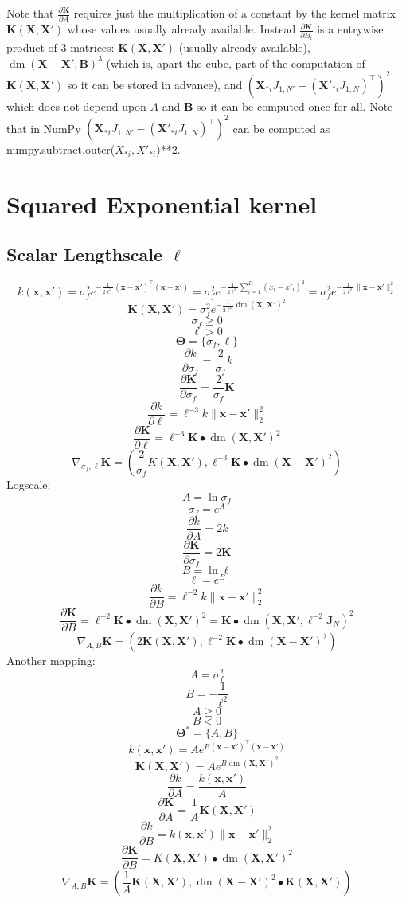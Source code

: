 \documentclass[a4paper,11pt]{article}
\newcommand\x{{\mathbf x}}
\newcommand\X{{\mathbf X}}
\newcommand\K{{\mathbf K}}
\newcommand\J{{\mathbf J}}
\DeclareMathOperator*{\dm}{dm}
\begin{document}
Note that $\frac{\partial \K}{\partial A}$ requires just the
multiplication of a constant by the kernel matrix $\K(\X,\X')$ whose
values usually already available. Instead $\frac{\partial \K}{\partial
  B_i}$ is a entrywise product of 3 matrices: $\K(\X,\X')$ (usually
already available), $\dm(\X-\X',\mathbf{B})^3$ (which is, apart the
cube, part of the computation of $\K(\X,\X')$ so it can be stored in
advance), and $(\X_{*i}J_{1,N'}- (\X'_{*i}J_{1,N})^{\top})^2$ which
does not depend upon $A$ and $\mathbf{B}$ so it can be computed once
for all. Note that in NumPy $(\X_{*i}J_{1,N'}-
(\X'_{*i}J_{1,N})^{\top})^2$ can be computed as {\ttfamily
  numpy.subtract.outer($X_{*i},X'_{*i}$)**2}.

\section{Squared Exponential kernel}

\subsection{Scalar Lengthscale $\ell$}
$$k(\x,\x') = \sigma_f^2 e^{-\frac{1}{2\ell^2} (\x-\x')^{\top}(\x-\x')}
  = \sigma_f^2 e^{-\frac{1}{2\ell^2} \sum_{i=1}^D (x_i - x'_i)^2} =
  \sigma_f^2 e^{-\frac{1}{2\ell^2} \|\x-\x'\|_2^2}$$ 
$$\K(\X,\X') = \sigma_f^2 e^{-\frac{1}{2\ell^2} \dm(\X,\X')^2}$$
$$\sigma_f \ge 0$$
$$\ell > 0$$
$$\mathbf{\Theta} = \{ \sigma_f, \ell \}$$
$$\frac{\partial k}{\partial \sigma_f} = \frac{2}{\sigma_f}k$$
$$\frac{\partial \K}{\partial \sigma_f} = \frac{2}{\sigma_f}\K$$
$$\frac{\partial k}{\partial \ell} = \ell^{-3} k \|\x-\x'\|_2^2 $$
$$\frac{\partial \K}{\partial \ell} = \ell^{-3} \K \bullet \dm(\X,\X')^2$$
$$\nabla_{\sigma_f,\ell} \K = \left(\frac{2}{\sigma_f}K(\X,\X'), \ell^{-3} \K \bullet \dm(\X-\X')^2 \right)$$
Logscale:
$$A = \ln{\sigma_f}$$
$$\sigma_f = e^A$$
$$\frac{\partial k}{\partial A} = 2k$$
$$\frac{\partial \K}{\partial \sigma_f} = 2\K$$
$$B = \ln{\ell}$$
$$\ell = e^B$$
$$\frac{\partial k}{\partial B} = \ell^{-2} k \|\x-\x'\|_2^2$$
$$\frac{\partial \K}{\partial B} = \ell^{-2} \K \bullet \dm(\X,\X')^2 = \K \bullet \dm(\X,\X',\ell^{-2}\J_N)^2$$
$$\nabla_{A,B} \K = \left( 2\K(\X,\X'), \ell^{-2} \K \bullet \dm(\X-\X')^2 \right)$$
Another mapping:
$$A = \sigma_f^2$$
$$B = -\frac{1}{\ell^2}$$
$$A \ge 0$$
$$B < 0$$
$$\mathbf{\Theta}^* = \{ A, B\}$$
$$k(\x,\x') = A e^{B (\x-\x')^{\top}(\x-\x')}$$
$$\K(\X,\X') = A e^{B \dm(\X,\X')^2}$$
$$\frac{\partial k}{\partial A} = \frac{k(\x,\x')}{A}$$
$$\frac{\partial \K}{\partial A} = \frac{1}{A}\K(\X,\X')$$
$$\frac{\partial k}{\partial B} = k(\x,\x') \|\x-\x'\|_2^2$$
$$\frac{\partial \K}{\partial B} = K(\X,\X') \bullet \dm(\X,\X')^2$$
$$\nabla_{A,B} \K = (\frac{1}{A} \K(\X,\X'), \dm(\X-\X')^2 \bullet
\K(\X,\X'))$$
\end{document}
